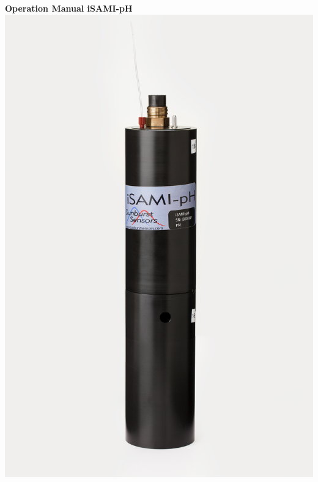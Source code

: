 \documentclass[twoside,letterpaper]{article}
\let\stdsection\section
\renewcommand\section{\newpage\stdsection}
\begin{document}

\let\oldsection\section
\def\section{\cleardoublepage\oldsection}

\begin{titlepage}
	\thispagestyle{empty}
		\begin{nolinenumbers}
           \vspace*{-3cm}
           \begin{center}
				{\Huge \textsf{\textbf{Operation Manual iSAMI-pH\\}}}
                \vspace{0.5cm}
                \includegraphics[scale=0.7]{figs/iSAMIsmall.png}
			\end{center}
			\vspace*{\fill}


\end{nolinenumbers}
\end{titlepage}
\end{document}
